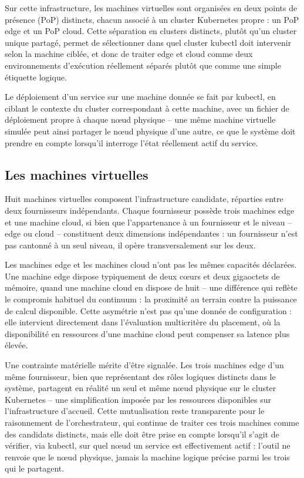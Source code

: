 Sur cette infrastructure, les machines virtuelles sont organisées en deux points de présence (PoP) distincts, chacun associé à un cluster Kubernetes propre : un PoP edge et un PoP cloud. Cette séparation en clusters distincts, plutôt qu'un cluster unique partagé, permet de sélectionner dans quel cluster kubectl doit intervenir selon la machine ciblée, et donc de traiter edge et cloud comme deux environnements d'exécution réellement séparés plutôt que comme une simple étiquette logique.

Le déploiement d'un service sur une machine donnée se fait par kubectl, en ciblant le contexte du cluster correspondant à cette machine, avec un fichier de déploiement propre à chaque nœud physique -- une même machine virtuelle simulée peut ainsi partager le nœud physique d'une autre, ce que le système doit prendre en compte lorsqu'il interroge l'état réellement actif du service.

\subsection{Les machines virtuelles}
\label{sec:vms}

Huit machines virtuelles composent l'infrastructure candidate, réparties entre deux fournisseurs indépendants. Chaque fournisseur possède trois machines edge et une machine cloud, si bien que l'appartenance à un fournisseur et le niveau -- edge ou cloud -- constituent deux dimensions indépendantes : un fournisseur n'est pas cantonné à un seul niveau, il opère transversalement sur les deux.

Les machines edge et les machines cloud n'ont pas les mêmes capacités déclarées. Une machine edge dispose typiquement de deux cœurs et deux gigaoctets de mémoire, quand une machine cloud en dispose de huit -- une différence qui reflète le compromis habituel du continuum : la proximité au terrain contre la puissance de calcul disponible. Cette asymétrie n'est pas qu'une donnée de configuration : elle intervient directement dans l'évaluation multicritère du placement, où la disponibilité en ressources d'une machine cloud peut compenser sa latence plus élevée.

Une contrainte matérielle mérite d'être signalée. Les trois machines edge d'un même fournisseur, bien que représentant des rôles logiques distincts dans le système, partagent en réalité un seul et même nœud physique sur le cluster Kubernetes -- une simplification imposée par les ressources disponibles sur l'infrastructure d'accueil. Cette mutualisation reste transparente pour le raisonnement de l'orchestrateur, qui continue de traiter ces trois machines comme des candidats distincts, mais elle doit être prise en compte lorsqu'il s'agit de vérifier, via kubectl, sur quel nœud un service est effectivement actif : l'outil ne renvoie que le nœud physique, jamais la machine logique précise parmi les trois qui le partagent.
